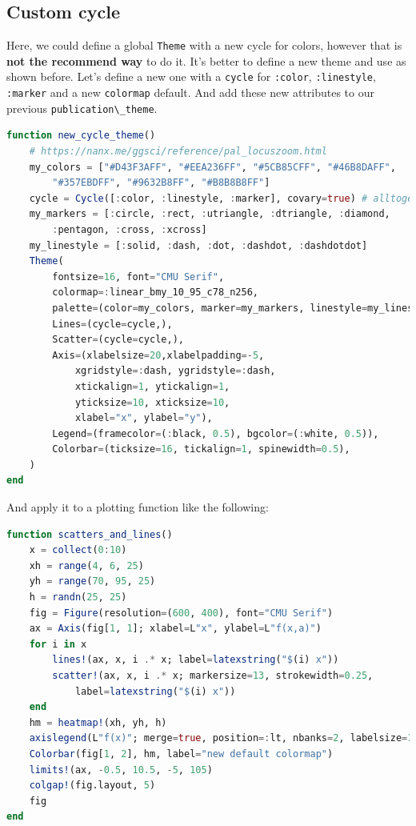 \documentclass[
  notoc %
]{tufte-book}
\newcommand{\passthrough}[1]{#1}
\begin{document}
\hypertarget{custom-cycle}{%
\subsection{Custom cycle}\label{custom-cycle}}

Here, we could define a global \passthrough{\lstinline!Theme!} with a
new cycle for colors, however that is \textbf{not the recommend way} to
do it. It's better to define a new theme and use as shown before. Let's
define a new one with a \passthrough{\lstinline!cycle!} for
\passthrough{\lstinline!:color!}, \passthrough{\lstinline!:linestyle!},
\passthrough{\lstinline!:marker!} and a new
\passthrough{\lstinline!colormap!} default. And add these new attributes
to our previous \passthrough{\lstinline!publication\_theme!}.

\begin{lstlisting}[language=Julia]
function new_cycle_theme()
    # https://nanx.me/ggsci/reference/pal_locuszoom.html
    my_colors = ["#D43F3AFF", "#EEA236FF", "#5CB85CFF", "#46B8DAFF",
        "#357EBDFF", "#9632B8FF", "#B8B8B8FF"]
    cycle = Cycle([:color, :linestyle, :marker], covary=true) # alltogether
    my_markers = [:circle, :rect, :utriangle, :dtriangle, :diamond,
        :pentagon, :cross, :xcross]
    my_linestyle = [:solid, :dash, :dot, :dashdot, :dashdotdot]
    Theme(
        fontsize=16, font="CMU Serif",
        colormap=:linear_bmy_10_95_c78_n256,
        palette=(color=my_colors, marker=my_markers, linestyle=my_linestyle),
        Lines=(cycle=cycle,),
        Scatter=(cycle=cycle,),
        Axis=(xlabelsize=20,xlabelpadding=-5,
            xgridstyle=:dash, ygridstyle=:dash,
            xtickalign=1, ytickalign=1,
            yticksize=10, xticksize=10,
            xlabel="x", ylabel="y"),
        Legend=(framecolor=(:black, 0.5), bgcolor=(:white, 0.5)),
        Colorbar=(ticksize=16, tickalign=1, spinewidth=0.5),
    )
end
\end{lstlisting}

And apply it to a plotting function like the following:

\begin{lstlisting}[language=Julia]
function scatters_and_lines()
    x = collect(0:10)
    xh = range(4, 6, 25)
    yh = range(70, 95, 25)
    h = randn(25, 25)
    fig = Figure(resolution=(600, 400), font="CMU Serif")
    ax = Axis(fig[1, 1]; xlabel=L"x", ylabel=L"f(x,a)")
    for i in x
        lines!(ax, x, i .* x; label=latexstring("$(i) x"))
        scatter!(ax, x, i .* x; markersize=13, strokewidth=0.25,
            label=latexstring("$(i) x"))
    end
    hm = heatmap!(xh, yh, h)
    axislegend(L"f(x)"; merge=true, position=:lt, nbanks=2, labelsize=14)
    Colorbar(fig[1, 2], hm, label="new default colormap")
    limits!(ax, -0.5, 10.5, -5, 105)
    colgap!(fig.layout, 5)
    fig
end
\end{lstlisting}
\end{document}
